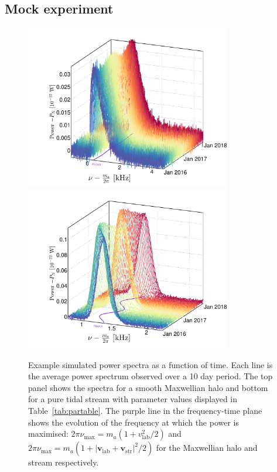 \subsection{Mock experiment}\label{sec:axions_analysis}
\begin{figure}
\begin{center}
	\includegraphics[width=0.8\textwidth]{Figures/axionpowerspectrum-eps-converted-to.pdf}\\
	\includegraphics[width=0.8\textwidth]{Figures/axionpowerspectrum_stream-eps-converted-to.pdf}
    \caption[Example simulated axion power spectra as a function of time]{Example simulated power spectra as a function of time. Each line is the average power spectrum observed over a 10 day period. The top panel shows the spectra for a smooth Maxwellian halo and bottom for a pure tidal stream with parameter values displayed in Table~\ref{tab:partable}. The purple line in the frequency-time plane shows the evolution of the frequency at which the power is maximised: $2\pi\nu_\textrm{max} = m_a(1+ v_\textrm{lab}^2/2)$ and $2\pi\nu_\textrm{max} = m_a(1+ |\textbf{v}_\textrm{lab}+\textbf{v}_\textrm{str}|^2/2)$ for the Maxwellian halo and stream respectively.}\label{fig:axionpowerspectrum}
\end{center}
\end{figure}


